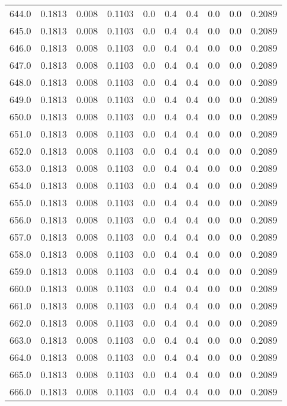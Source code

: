 \begin{longtable}{lrrrrrrrrr}
644.0 & 0.1813 & 0.008 & 0.1103 & 0.0 & 0.4 & 0.4 & 0.0 & 0.0 & 0.2089 \\
645.0 & 0.1813 & 0.008 & 0.1103 & 0.0 & 0.4 & 0.4 & 0.0 & 0.0 & 0.2089 \\
646.0 & 0.1813 & 0.008 & 0.1103 & 0.0 & 0.4 & 0.4 & 0.0 & 0.0 & 0.2089 \\
647.0 & 0.1813 & 0.008 & 0.1103 & 0.0 & 0.4 & 0.4 & 0.0 & 0.0 & 0.2089 \\
648.0 & 0.1813 & 0.008 & 0.1103 & 0.0 & 0.4 & 0.4 & 0.0 & 0.0 & 0.2089 \\
649.0 & 0.1813 & 0.008 & 0.1103 & 0.0 & 0.4 & 0.4 & 0.0 & 0.0 & 0.2089 \\
650.0 & 0.1813 & 0.008 & 0.1103 & 0.0 & 0.4 & 0.4 & 0.0 & 0.0 & 0.2089 \\
651.0 & 0.1813 & 0.008 & 0.1103 & 0.0 & 0.4 & 0.4 & 0.0 & 0.0 & 0.2089 \\
652.0 & 0.1813 & 0.008 & 0.1103 & 0.0 & 0.4 & 0.4 & 0.0 & 0.0 & 0.2089 \\
653.0 & 0.1813 & 0.008 & 0.1103 & 0.0 & 0.4 & 0.4 & 0.0 & 0.0 & 0.2089 \\
654.0 & 0.1813 & 0.008 & 0.1103 & 0.0 & 0.4 & 0.4 & 0.0 & 0.0 & 0.2089 \\
655.0 & 0.1813 & 0.008 & 0.1103 & 0.0 & 0.4 & 0.4 & 0.0 & 0.0 & 0.2089 \\
656.0 & 0.1813 & 0.008 & 0.1103 & 0.0 & 0.4 & 0.4 & 0.0 & 0.0 & 0.2089 \\
657.0 & 0.1813 & 0.008 & 0.1103 & 0.0 & 0.4 & 0.4 & 0.0 & 0.0 & 0.2089 \\
658.0 & 0.1813 & 0.008 & 0.1103 & 0.0 & 0.4 & 0.4 & 0.0 & 0.0 & 0.2089 \\
659.0 & 0.1813 & 0.008 & 0.1103 & 0.0 & 0.4 & 0.4 & 0.0 & 0.0 & 0.2089 \\
660.0 & 0.1813 & 0.008 & 0.1103 & 0.0 & 0.4 & 0.4 & 0.0 & 0.0 & 0.2089 \\
661.0 & 0.1813 & 0.008 & 0.1103 & 0.0 & 0.4 & 0.4 & 0.0 & 0.0 & 0.2089 \\
662.0 & 0.1813 & 0.008 & 0.1103 & 0.0 & 0.4 & 0.4 & 0.0 & 0.0 & 0.2089 \\
663.0 & 0.1813 & 0.008 & 0.1103 & 0.0 & 0.4 & 0.4 & 0.0 & 0.0 & 0.2089 \\
664.0 & 0.1813 & 0.008 & 0.1103 & 0.0 & 0.4 & 0.4 & 0.0 & 0.0 & 0.2089 \\
665.0 & 0.1813 & 0.008 & 0.1103 & 0.0 & 0.4 & 0.4 & 0.0 & 0.0 & 0.2089 \\
666.0 & 0.1813 & 0.008 & 0.1103 & 0.0 & 0.4 & 0.4 & 0.0 & 0.0 & 0.2089 \\

\end{longtable}
